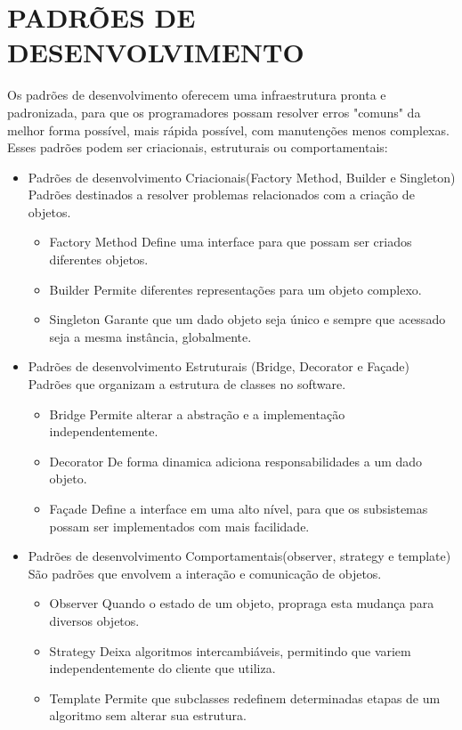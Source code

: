 \documentclass[12pt]{article}
\begin{document}
    \section{PADRÕES DE DESENVOLVIMENTO}
        Os padrões de desenvolvimento oferecem uma infraestrutura pronta e padronizada, para que os programadores possam resolver erros "comuns" da melhor forma possível, mais rápida possível, com manutenções menos complexas. Esses padrões podem ser criacionais, estruturais ou comportamentais:
        \begin{itemize}
            \item Padrões de desenvolvimento Criacionais(Factory Method, Builder e Singleton)
            Padrões destinados a resolver problemas relacionados com a criação de objetos. 
            \begin{itemize}
                \item Factory Method
                Define uma interface para que possam ser criados diferentes objetos.
                \item Builder
                Permite diferentes representações para um objeto complexo.
                \item Singleton
                Garante que um dado objeto seja único e sempre que acessado seja a mesma instância, globalmente.
            \end{itemize}
            \item Padrões de desenvolvimento Estruturais (Bridge, Decorator e Façade)
            Padrões que organizam a estrutura de classes no software.
            \begin{itemize}
                \item Bridge
                    Permite alterar a abstração e a implementação independentemente.
                \item Decorator
                    De forma dinamica adiciona responsabilidades a um dado objeto.
                \item Façade
                    Define a interface em uma alto nível, para que os subsistemas possam ser implementados com mais facilidade.
            \end{itemize}
            \item Padrões de desenvolvimento Comportamentais(observer, strategy e template)
                São padrões que envolvem a interação e comunicação de objetos.
                \begin{itemize}
                    \item Observer
                        Quando o estado de um objeto, propraga esta mudança para diversos objetos.
                    \item Strategy
                        Deixa algoritmos intercambiáveis, permitindo que variem independentemente do cliente que utiliza.
                    \item Template
                        Permite que subclasses redefinem determinadas etapas de um algoritmo sem alterar sua estrutura.
                \end{itemize}
        \end{itemize}
\end{document}
